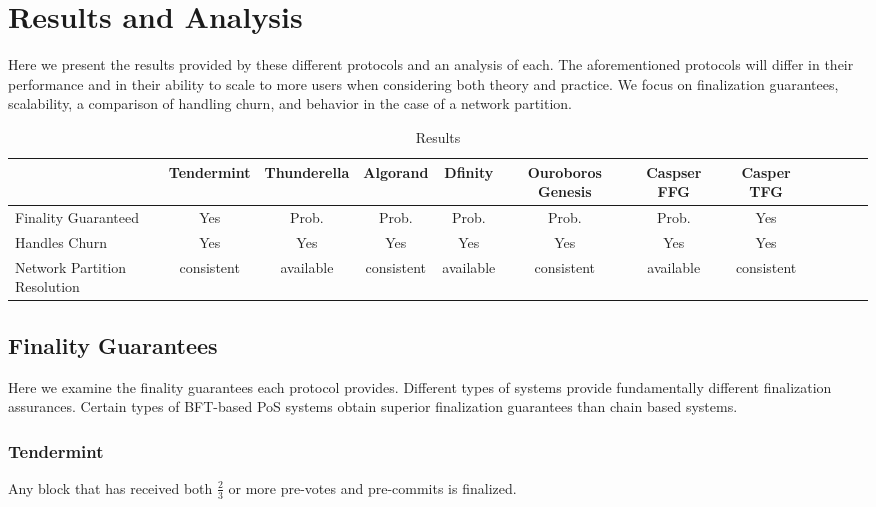 \documentclass[10pt,journal,compsoc]{IEEEtran}
\begin{document}
\section{Results and Analysis}
Here we present the results provided by these different protocols and an analysis of each. The aforementioned protocols will differ in their performance and in their ability to scale to more users when considering both theory and practice. We focus on finalization guarantees, scalability, a comparison of handling churn, and behavior in the case of a network partition.

\begin{table*}[htp]
 \caption{Results}
\label{}
\begin{tabularx}{\textwidth}{@{}l*{10}{c}c@{}}
\toprule
                 & Tendermint & Thunderella & Algorand & Dfinity & Ouroboros Genesis  & Caspser FFG & Casper TFG   \\ 
\midrule
Finality Guaranteed  & Yes  & Prob. & Prob.  & Prob. & Prob.  & Prob. & Yes    \\
\addlinespace
Handles Churn  & Yes  & Yes  & Yes & Yes & Yes & Yes & Yes\\ 
\addlinespace
Network Partition Resolution  & consistent & available & consistent  & available &  consistent &  available & consistent\\ 
\bottomrule
\end{tabularx}
\end{table*}


\subsection{Finality Guarantees}
Here we examine the finality guarantees each protocol provides. Different types of systems provide fundamentally different finalization assurances. Certain types of BFT-based PoS systems obtain superior finalization guarantees than chain based systems. 

\subsubsection{Tendermint} Any block that has received both \(\frac{2}{3}\) or more pre-votes and pre-commits is finalized. 
\end{document}
